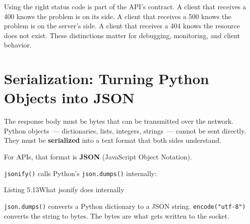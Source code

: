 Using the right status code is part of the API's contract. A client that receives a 400 knows the problem is on its side. A client that receives a 500 knows the problem is on the server's side. A client that receives a 404 knows the resource does not exist. These distinctions matter for debugging, monitoring, and client behavior.

\setcounter{section}{9}
\section{Serialization: Turning Python Objects into JSON}\label{05-internal-request-execution:510-serialization-turning-python-objects-into-json}

The response body must be bytes that can be transmitted over the network. Python objects~--- dictionaries, lists, integers, strings~--- cannot be sent directly. They must be \textbf{serialized} into a text format that both sides understand.

For APIs, that format is \textbf{JSON} (JavaScript Object Notation).

\texttt{jsonify()} calls Python's \texttt{json.dumps()} internally:

\begin{codeboxcap}[short]{\textcolor{accent}{Listing 5.13}\enspace What jsonify does internally}

\begin{Shaded}
\begin{Highlighting}[]

\OperatorTok{=}\NormalTok{ \{}\NormalTok{: }\NormalTok{, }\NormalTok{: }\NormalTok{\}}
\OperatorTok{=}

\OperatorTok{=}\NormalTok{)}
\end{Highlighting}
\end{Shaded}

\end{codeboxcap}

\noindent{}\texttt{json.dumps()} converts a Python dictionary to a JSON string. \texttt{encode("utf-8")} converts the string to bytes. The bytes are what gets written to the socket.

